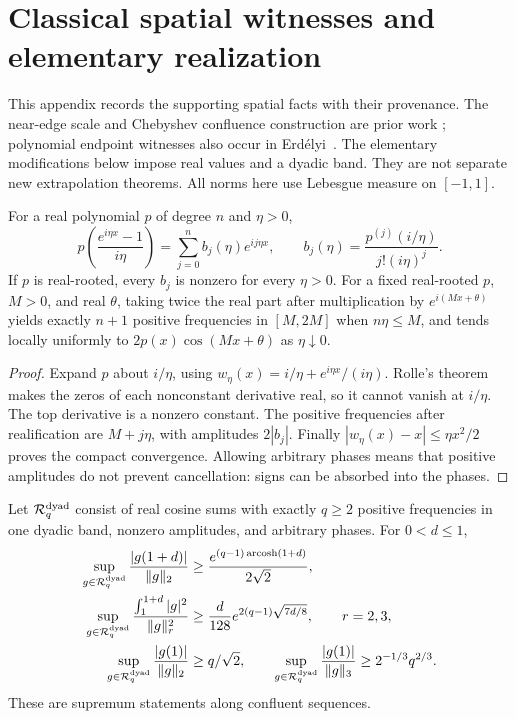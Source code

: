 \section{Classical spatial witnesses and elementary realization}
\label{sec:sharpness}

This appendix records the supporting spatial facts with their provenance.
The near-edge scale and Chebyshev confluence construction are prior work
\cite[Propositions 7.1 and 8.4]{Zhang2026}; polynomial endpoint witnesses
also occur in Erd\'elyi~\cite{Erdelyi2017}. The elementary modifications
below impose real values and a dyadic band. They are not separate
new extrapolation theorems. All norms here use Lebesgue measure on
$[-1,1]$.

\begin{lemma}\label{lem:confluent-real-rooted}
For a real polynomial $p$ of degree $n$ and $\eta>0$,
\begin{equation}\label{eq:confluent-map}
 p\left(\frac{e^{i\eta x}-1}{i\eta}\right)
 =\sum_{j=0}^n b_j(\eta)e^{ij\eta x},\qquad
 b_j(\eta)=\frac{p^{(j)}(i/\eta)}{j!(i\eta)^j}.
\end{equation}
If $p$ is real-rooted, every $b_j$ is nonzero for every $\eta>0$.
For a fixed real-rooted $p$, $M>0$, and real $\theta$, taking twice
the real part after multiplication
by $e^{i(Mx+\theta)}$ yields exactly $n+1$ positive frequencies in
$[M,2M]$ when $n\eta\le M$, and tends locally uniformly to
$2p(x)\cos(Mx+\theta)$ as $\eta\downarrow0$.
\end{lemma}

\begin{proof}
Expand $p$ about $i/\eta$, using
$w_\eta(x)=i/\eta+e^{i\eta x}/(i\eta)$. Rolle's theorem makes the zeros
of each nonconstant derivative real, so it cannot vanish at $i/\eta$.
The top derivative is a nonzero constant.
The positive frequencies after realification are $M+j\eta$, with
amplitudes $2|b_j|$. Finally
$|w_\eta(x)-x|\le\eta x^2/2$ proves the compact convergence.
Allowing arbitrary phases means that positive amplitudes do not
prevent cancellation: signs can be absorbed into the phases.
\end{proof}

\begin{proposition}
\label{thm:real-dyadic-lower}
Let $\mathcal R_q^{\rm dyad}$ consist of real cosine sums with exactly
$q\ge2$ positive frequencies in one dyadic band, nonzero amplitudes,
and arbitrary phases. For $0<d\le1$,
\begin{align*}
 \sup_{g\in\mathcal R_q^{\rm dyad}}
 \frac{|g(1+d)|}{\|g\|_2}
 &\ge\frac{e^{(q-1)\operatorname{arcosh}(1+d)}}{2\sqrt2},\\
 \sup_{g\in\mathcal R_q^{\rm dyad}}
 \frac{\int_1^{1+d}|g|^2}{\|g\|_r^2}
 &\ge\frac d{128}e^{2(q-1)\sqrt{7d/8}},\qquad r=2,3,\\
 \sup_{g\in\mathcal R_q^{\rm dyad}}\frac{|g(1)|}{\|g\|_2}
 &\ge q/\sqrt2,\qquad
 \sup_{g\in\mathcal R_q^{\rm dyad}}\frac{|g(1)|}{\|g\|_3}
 \ge2^{-1/3}q^{2/3}.
\end{align*}
These are supremum statements along confluent sequences.
\end{proposition}

